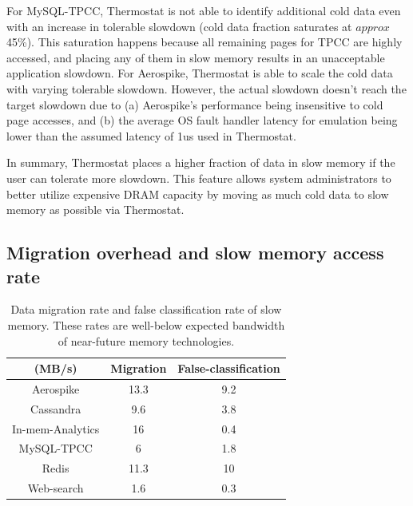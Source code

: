 For MySQL-TPCC, Thermostat is not able to identify additional cold data even with
an increase in tolerable slowdown (cold data fraction saturates at $approx$ 45\%).
This saturation happens because all remaining pages for TPCC are highly accessed, and
placing any of them in slow memory results in an unacceptable application
slowdown.
For Aerospike, Thermostat is able to scale the cold data
with varying tolerable slowdown. However, the actual slowdown doesn't reach the
target slowdown due to (a) Aerospike's performance being insensitive to cold page
accesses, and (b) the average OS fault handler latency for emulation being lower
than the assumed latency of 1us used in Thermostat.

In summary, Thermostat places a higher fraction of data in slow memory if
the user can tolerate more slowdown. This feature
allows system administrators to better utilize expensive DRAM capacity by moving
as much cold data to slow memory as possible via Thermostat.

\subsection{Migration overhead and slow memory access rate}
\begin{table}
\begin{center}
\begin{tabular}{|c|c|c|}
\hline
(MB/s)&Migration& False-classification\\
\hline
Aerospike & 13.3& 9.2\\
\hline
Cassandra & 9.6 & 3.8\\
\hline
In-mem-Analytics & 16& 0.4\\
\hline
MySQL-TPCC & 6 & 1.8\\
\hline
Redis & 11.3& 10\\
\hline
Web-search & 1.6 & 0.3\\
\hline
\end{tabular}
\caption{Data migration rate and false classification rate of slow memory. These rates are
well-below expected bandwidth of near-future memory technologies.}
\label{tab:nvm-access-rate}
\end{center}
\vspace{-0.15in}
\end{table}


